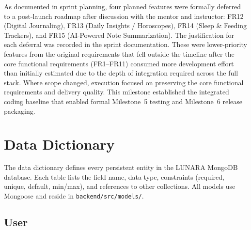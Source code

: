 \documentclass[12pt,letterpaper]{article}
\begin{document}
As documented in sprint planning, four planned features were formally deferred to a post-launch roadmap after discussion with the mentor and instructor: FR12 (Digital Journaling), FR13 (Daily Insights / Horoscopes), FR14 (Sleep \& Feeding Trackers), and FR15 (AI-Powered Note Summarization). The justification for each deferral was recorded in the sprint documentation. These were lower-priority features from the original requirements that fell outside the timeline after the core functional requirements (FR1--FR11) consumed more development effort than initially estimated due to the depth of integration required across the full stack. Where scope changed, execution focused on preserving the core functional requirements and delivery quality. This milestone established the integrated coding baseline that enabled formal Milestone~5 testing and Milestone~6 release packaging.

\section{Data Dictionary}

The data dictionary defines every persistent entity in the LUNARA MongoDB database. Each table lists the field name, data type, constraints (required, unique, default, min/max), and references to other collections. All models use Mongoose and reside in \texttt{backend/src/models/}.


\subsection{User}
\end{document}
